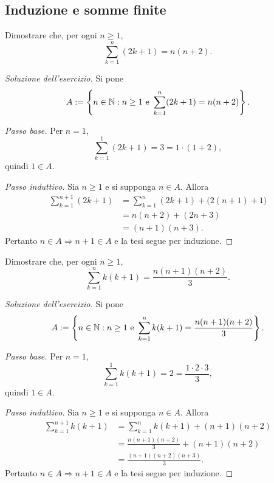 \subsection{Induzione e somme finite}
\label{sec:esercizi-fondamenti-induzione}

\begin{exercise}
\label{ex:fondamenti-somma-progressione}
Dimostrare che, per ogni $n\ge1$,
\[
  \sum_{k=1}^{n}(2k+1)=n(n+2).
\]
\end{exercise}
\begin{proof}[Soluzione dell'esercizio]
Si pone
\[
  A:=\left\{n\in\mathbb{N}:n\ge1\ \text{e}\
    \sum_{k=1}^{n}(2k+1)=n(n+2)\right\}.
\]

\emph{Passo base.} Per $n=1$,
\[
  \sum_{k=1}^{1}(2k+1)=3=1\cdot(1+2),
\]
quindi $1\in A$.

\emph{Passo induttivo.} Sia $n\ge1$ e si supponga $n\in A$. Allora
\[
\begin{aligned}
  \sum_{k=1}^{n+1}(2k+1)
    &=\sum_{k=1}^{n}(2k+1)+\bigl(2(n+1)+1\bigr)\\
    &=n(n+2)+(2n+3)\\
    &=(n+1)(n+3).
\end{aligned}
\]
Pertanto $n\in A\Rightarrow n+1\in A$ e la tesi segue per induzione.
\end{proof}

\begin{exercise}
\label{ex:fondamenti-somma-prodotti-consecutivi}
Dimostrare che, per ogni $n\ge1$,
\[
  \sum_{k=1}^{n}k(k+1)=\frac{n(n+1)(n+2)}{3}.
\]
\end{exercise}
\begin{proof}[Soluzione dell'esercizio]
Si pone
\[
  A:=\left\{n\in\mathbb{N}:n\ge1\ \text{e}\
    \sum_{k=1}^{n}k(k+1)=\frac{n(n+1)(n+2)}{3}\right\}.
\]

\emph{Passo base.} Per $n=1$,
\[
  \sum_{k=1}^{1}k(k+1)=2=\frac{1\cdot2\cdot3}{3},
\]
quindi $1\in A$.

\emph{Passo induttivo.} Sia $n\ge1$ e si supponga $n\in A$. Allora
\[
\begin{aligned}
  \sum_{k=1}^{n+1}k(k+1)
    &=\sum_{k=1}^{n}k(k+1)+(n+1)(n+2)\\
    &=\frac{n(n+1)(n+2)}{3}+(n+1)(n+2)\\
    &=\frac{(n+1)(n+2)(n+3)}{3}.
\end{aligned}
\]
Pertanto $n\in A\Rightarrow n+1\in A$ e la tesi segue per induzione.
\end{proof}

